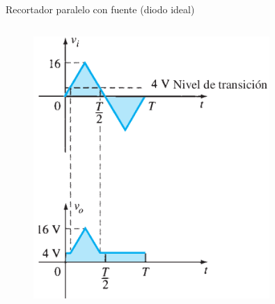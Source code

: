 \documentclass[t,aspectratio=169]{beamer}
\begin{document}
\begin{frame}{Recortador paralelo con fuente (diodo ideal)}
\begin{columns}
\begin{column}{0.5\textwidth}
\begin{figure}
    \centering
    \includegraphics[width=0.8\textwidth]{figures/recortador_paralelo_ideal_fuente_1.png}
\end{figure}

\end{column}
\end{columns}

\end{frame}
\end{document}

